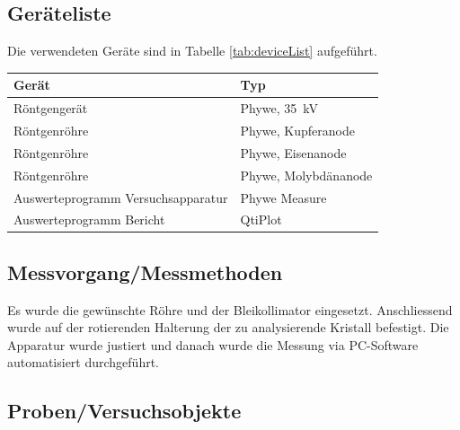 \clearpage
\subsection{Ger\"ateliste}
\label{subsec:deviceList}

Die verwendeten Ger\"ate sind in Tabelle \ref{tab:deviceList} aufgef\"uhrt.

\label{tab:deviceList}
\begin{tabular}{ll}
    \toprule
    Ger\"at & Typ \\
    \midrule
    R\"ontgenger\"at & Phywe, \SI{35}{\kilo\volt} \\
    R\"ontgenr\"ohre & Phywe, Kupferanode \\
    R\"ontgenr\"ohre & Phywe, Eisenanode \\
    R\"ontgenr\"ohre & Phywe, Molybd\"ananode \\
    Auswerteprogramm Versuchsapparatur              & Phywe Measure \\
    Auswerteprogramm Bericht              & QtiPlot \\
    \bottomrule
\end{tabular}


\subsection{Messvorgang/Messmethoden}
\label{subsec:measurementMethods}

Es    wurde    die    gew\"unschte     R\"ohre    und    der    Bleikollimator
eingesetzt. Anschliessend  wurde   auf  der   rotierenden  Halterung   der  zu
analysierende  Kristall befestigt. Die  Apparatur  wurde  justiert und  danach
wurde die Messung via PC-Software automatisiert durchgef\"uhrt.

\subsection{Proben/Versuchsobjekte}
\label{subsec:samples}

